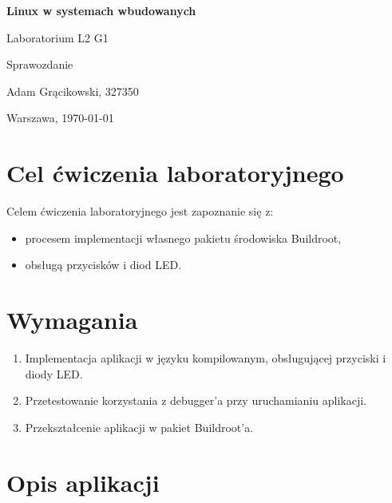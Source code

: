 \documentclass{article}
\begin{document}
\begin{titlepage}
    \centering
    \vfill    
    {\fontsize{40}{20}\selectfont \textbf{Linux w systemach wbudowanych} \par}
    \vspace{2cm}
    {\fontsize{30}{20}\selectfont Laboratorium L2 G1\par}
    \vspace{2cm}
    {\fontsize{20}{20}\selectfont Sprawozdanie\par}
    \vfill
    {\fontsize{10}{20}\selectfont Adam Grącikowski, 327350\par}
    \vspace{1cm}
    Warszawa, \today
\end{titlepage}



\tableofcontents
\newpage
\section{Cel ćwiczenia laboratoryjnego}

Celem ćwiczenia laboratoryjnego jest zapoznanie się z:

\begin{itemize}
    \item procesem implementacji własnego pakietu środowiska Buildroot,
    \item obsługą przycisków i diod LED.
\end{itemize}

\section{Wymagania}

\begin{enumerate}[label=\arabic*.]
    \item Implementacja aplikacji w języku kompilowanym, obsługującej przyciski i diody LED.
    \item Przetestowanie korzystania z debugger'a przy uruchamianiu aplikacji.
    \item Przekształcenie aplikacji w pakiet Buildroot'a.
\end{enumerate}

\section{Opis aplikacji}
\end{document}
